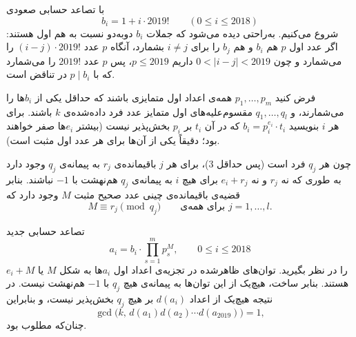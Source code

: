 با تصاعد حسابی صعودی
\[
b_i = 1 + i \cdot 2019! \qquad (0 \leq i \leq 2018)
\]
شروع می‌کنیم. به‌راحتی دیده می‌شود که جملات $b_i$ دو‌به‌دو نسبت به هم اول هستند: اگر عدد اول $p$ هم $b_i$ و هم $b_j$ را برای $i \neq j$ بشمارد، آنگاه $p$ عدد $(i-j)\cdot 2019!$ را می‌شمارد و چون $0 < |i-j| < 2019$ داریم $p \leq 2019$، پس $p$ عدد $2019!$ را می‌شمارد که با $p \mid b_i$ در تناقض است.

فرض کنید $p_1, \dots, p_m$ همه‌ی اعداد اول متمایزی باشند که حداقل یکی از $b_i$ها را می‌شمارند، و $q_1, \dots, q_l$ مقسوم‌علیه‌های اول متمایز عدد فرد داده‌شده‌ی $k$ باشند. برای هر $i$ بنویسید $b_i = p_i^{e_i} \cdot t_i$ که در آن $t_i$ بر $p_i$ بخش‌پذیر نیست (بیشتر $e_i$ها صفر خواهند بود؛ دقیقاً یکی از آن‌ها برای هر عدد اول مثبت است).

چون هر $q_j$ فرد است (پس حداقل $3$)، برای هر $j$ باقیمانده‌ی $r_j$ به پیمانه‌ی $q_j$ وجود دارد به طوری که نه $r_j$ و نه $e_i + r_j$ برای هیچ $i$ به پیمانه‌ی $q_j$ هم‌نهشت با $-1$ نباشند. بنابر قضیه‌ی باقیمانده‌ی چینی عدد صحیح مثبت $M$ وجود دارد که
\[
M \equiv r_j \pmod{q_j} \qquad \text{برای همه‌ی } j = 1, \dots, l.
\]

تصاعد حسابی جدید
\[
a_i = b_i \cdot \prod_{s=1}^m p_s^{M}, \qquad 0 \leq i \leq 2018
\]
را در نظر بگیرید. توان‌های ظاهرشده در تجزیه‌ی اعداد اول $a_i$ها به شکل $M$ یا $e_i + M$ هستند. بنابر ساخت، هیچ‌یک از این توان‌ها به پیمانه‌ی هیچ $q_j$ با $-1$ هم‌نهشت نیست. در نتیجه هیچ‌یک از اعداد $d(a_i)$ بر هیچ $q_j$ بخش‌پذیر نیست، و بنابراین
\[
\gcd\bigl(k,\, d(a_1)d(a_2)\cdots d(a_{2019})\bigr) = 1,
\]
چنان‌که مطلوب بود.
